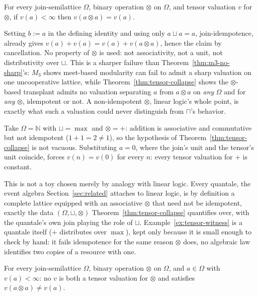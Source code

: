 \begin{theorem}
\label{thm:tensor-collapse}
For every join-semilattice $\Omega$, binary operation $\otimes$ on
$\Omega$, and tensor valuation $v$ for $\otimes$, if $v(a) < \infty$
then $v(a \otimes a) = v(a)$.
\end{theorem}

\noindent
Setting $b := a$ in the defining identity and using only
$a \sqcup a = a$, join-idempotence, already gives
$v(a) + v(a) = v(a) + v(a \otimes a)$, hence the claim by
cancellation. No property of $\otimes$ is used: not associativity,
not a unit, not distributivity over $\sqcup$. This is a sharper
failure than Theorem~\ref{thm:m3-no-sharp}'s: $M_3$ shows meet-based
modularity can fail to admit a sharp valuation on one uncooperative
lattice, while Theorem~\ref{thm:tensor-collapse} shows the
$\otimes$-based transplant admits no valuation separating $a$ from
$a \otimes a$ on \emph{any} $\Omega$ and for \emph{any} $\otimes$,
idempotent or not. A non-idempotent $\otimes$, linear logic's whole
point, is exactly what such a valuation could never distinguish from
$\sqcap$'s behavior.

\begin{example}
\label{ex:tensor-witness}
Take $\Omega = \mathbb{N}$ with $\sqcup = \max$ and $\otimes = {+}$:
addition is associative and commutative but not idempotent
($1 + 1 = 2 \ne 1$), so the hypothesis of
Theorem~\ref{thm:tensor-collapse} is not vacuous. Substituting
$a = 0$, where the join's unit and the tensor's unit coincide,
forces $v(n) = v(0)$ for every $n$: every tensor valuation for $+$
is constant.
\end{example}

\noindent
This is not a toy chosen merely by analogy with linear logic.
Every quantale, the event algebra Section~\ref{sec:related} attaches
to linear logic, is by definition a complete lattice equipped with
an associative $\otimes$ that need not be idempotent, exactly the
data $(\Omega, \sqcup, \otimes)$ Theorem~\ref{thm:tensor-collapse}
quantifies over, with the quantale's own join playing the role of
$\sqcup$. Example~\ref{ex:tensor-witness} is a quantale itself
($+$ distributes over $\max$), kept only because it is small enough
to check by hand: it fails idempotence for the same reason
$\otimes$ does, no algebraic law identifies two copies of a resource
with one.

\begin{corollary}
\label{cor:tensor-dichotomy}
For every join-semilattice $\Omega$, binary operation $\otimes$ on
$\Omega$, and $a \in \Omega$ with $v(a) < \infty$: no $v$ is both a
tensor valuation for $\otimes$ and satisfies
$v(a \otimes a) \ne v(a)$.
\end{corollary}

